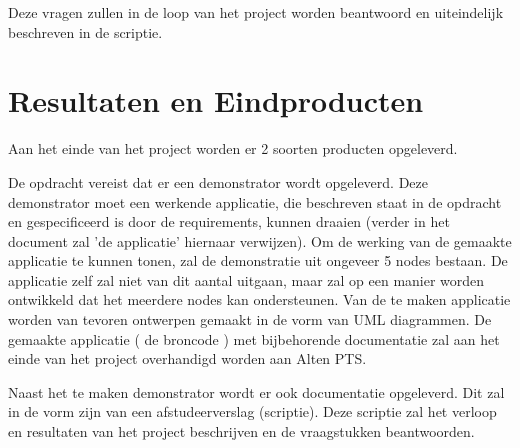 \documentclass{../local}
\begin{document}
Deze vragen zullen in de loop van het project worden beantwoord en uiteindelijk beschreven in de scriptie.

\section{Resultaten en Eindproducten}
Aan het einde van het project worden er 2 soorten producten opgeleverd.

De opdracht vereist dat er een demonstrator wordt opgeleverd. Deze demonstrator moet een werkende applicatie, die beschreven staat in de opdracht en gespecificeerd is door de requirements, kunnen draaien (verder in het document zal 'de applicatie' hiernaar verwijzen). Om de werking van de gemaakte applicatie te kunnen tonen, zal de demonstratie uit ongeveer 5 nodes bestaan. De applicatie zelf zal niet van dit aantal uitgaan, maar zal op een manier worden ontwikkeld dat het meerdere nodes kan ondersteunen. Van de te maken applicatie worden van tevoren ontwerpen gemaakt in de vorm van UML diagrammen. De gemaakte applicatie ( de broncode ) met bijbehorende documentatie zal aan het einde van het project overhandigd worden aan Alten PTS.

Naast het te maken demonstrator wordt er ook documentatie opgeleverd. Dit zal in de vorm zijn van een afstudeerverslag (scriptie). Deze scriptie zal het verloop en resultaten van het project beschrijven en de vraagstukken beantwoorden.
\end{document}

